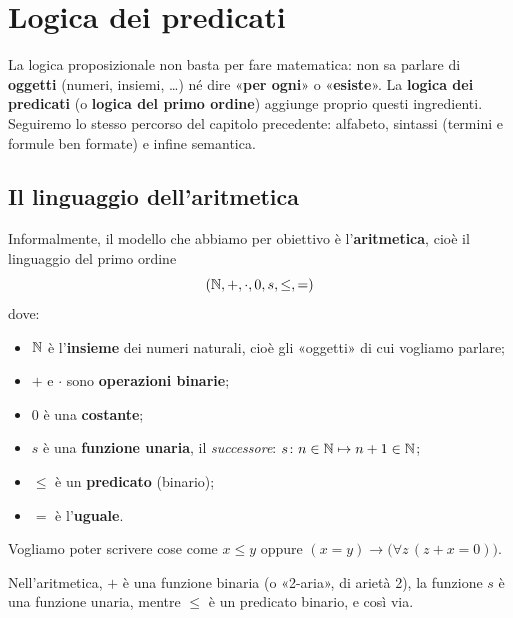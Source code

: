 \chapter{Logica dei predicati}\label{cap:predicati}

La logica proposizionale non basta per fare matematica: non sa parlare di \textbf{oggetti} (numeri, insiemi, \dots)
né dire «\textbf{per ogni}» o «\textbf{esiste}». La \textbf{logica dei predicati} (o \textbf{logica del primo ordine})
aggiunge proprio questi ingredienti. Seguiremo lo stesso percorso del capitolo precedente: alfabeto, sintassi
(termini e formule ben formate) e infine semantica.

\section{Il linguaggio dell'aritmetica}\label{sec:aritmetica}

Informalmente, il modello che abbiamo per obiettivo è l'\textbf{aritmetica}, cioè il linguaggio del primo ordine
\[ (\mathbb{N}, +, \cdot, 0, s, \leq, =) \]
dove:
\begin{itemize}
    \item $\mathbb{N}$ è l'\textbf{insieme} dei numeri naturali, cioè gli «oggetti» di cui vogliamo parlare;
    \item $+$ e $\cdot$ sono \textbf{operazioni binarie};
    \item $0$ è una \textbf{costante};
    \item $s$ è una \textbf{funzione unaria}, il \textit{successore}: $s \colon n \in \mathbb{N} \mapsto n + 1 \in \mathbb{N}$;
    \item $\leq$ è un \textbf{predicato} (binario);
    \item $=$ è l'\textbf{uguale}.
\end{itemize}
Vogliamo poter scrivere cose come $x \leq y$ oppure $(x = y) \rightarrow \big(\forall z\,(z + x = 0)\big)$.


Nell'aritmetica, $+$ è una funzione binaria (o «2-aria», di arietà 2), la funzione $s$ è una funzione unaria,
mentre $\leq$ è un predicato binario, e così via.

